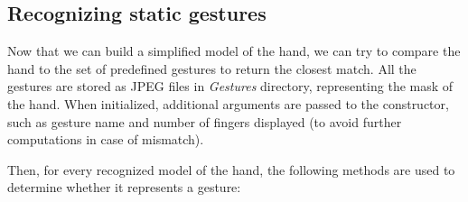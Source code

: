 \documentclass[a4paper,11pt,oneside]{article}
\begin{document}
\subsection{Recognizing static gestures}

Now that we can build a simplified model of the hand, we can try to compare the hand to the set of predefined gestures to return the closest match. All the gestures are stored as JPEG files in \textit{Gestures} directory, representing the mask of the hand. When initialized,  additional arguments are passed to the constructor, such as gesture name and number of fingers displayed (to avoid further computations in case of mismatch).

Then, for every recognized model of the hand, the following methods are used to determine whether it represents a gesture:\\
\end{document}
